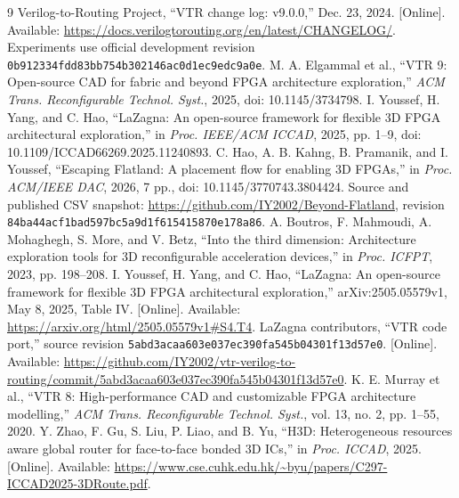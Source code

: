 \documentclass[conference,10pt]{IEEEtran}
\begin{document}
\begin{thebibliography}{9}
 Verilog-to-Routing Project, ``VTR change log: v9.0.0,'' Dec. 23, 2024. [Online]. Available: \url{https://docs.verilogtorouting.org/en/latest/CHANGELOG/}. Experiments use official development revision \texttt{0b912334fdd83bb754b302146ac0d1ec9edc9a0e}.
 M. A. Elgammal et al., ``VTR 9: Open-source CAD for fabric and beyond FPGA architecture exploration,'' \emph{ACM Trans. Reconfigurable Technol. Syst.}, 2025, doi: 10.1145/3734798.
 I. Youssef, H. Yang, and C. Hao, ``LaZagna: An open-source framework for flexible 3D FPGA architectural exploration,'' in \emph{Proc. IEEE/ACM ICCAD}, 2025, pp. 1--9, doi: 10.1109/ICCAD66269.2025.11240893.
 C. Hao, A. B. Kahng, B. Pramanik, and I. Youssef, ``Escaping Flatland: A placement flow for enabling 3D FPGAs,'' in \emph{Proc. ACM/IEEE DAC}, 2026, 7 pp., doi: 10.1145/3770743.3804424. Source and published CSV snapshot: \url{https://github.com/IY2002/Beyond-Flatland}, revision \texttt{84ba44acf1bad597bc5a9d1f615415870e178a86}.
 A. Boutros, F. Mahmoudi, A. Mohaghegh, S. More, and V. Betz, ``Into the third dimension: Architecture exploration tools for 3D reconfigurable acceleration devices,'' in \emph{Proc. ICFPT}, 2023, pp. 198--208.
 I. Youssef, H. Yang, and C. Hao, ``LaZagna: An open-source framework for flexible 3D FPGA architectural exploration,'' arXiv:2505.05579v1, May 8, 2025, Table IV. [Online]. Available: \url{https://arxiv.org/html/2505.05579v1#S4.T4}.
 LaZagna contributors, ``VTR code port,'' source revision \texttt{5abd3acaa603e037ec390fa545b04301f13d57e0}. [Online]. Available: \url{https://github.com/IY2002/vtr-verilog-to-routing/commit/5abd3acaa603e037ec390fa545b04301f13d57e0}.
 K. E. Murray et al., ``VTR 8: High-performance CAD and customizable FPGA architecture modelling,'' \emph{ACM Trans. Reconfigurable Technol. Syst.}, vol. 13, no. 2, pp. 1--55, 2020.
 Y. Zhao, F. Gu, S. Liu, P. Liao, and B. Yu, ``H3D: Heterogeneous resources aware global router for face-to-face bonded 3D ICs,'' in \emph{Proc. ICCAD}, 2025. [Online]. Available: \url{https://www.cse.cuhk.edu.hk/~byu/papers/C297-ICCAD2025-3DRoute.pdf}.
\end{thebibliography}
\end{document}
